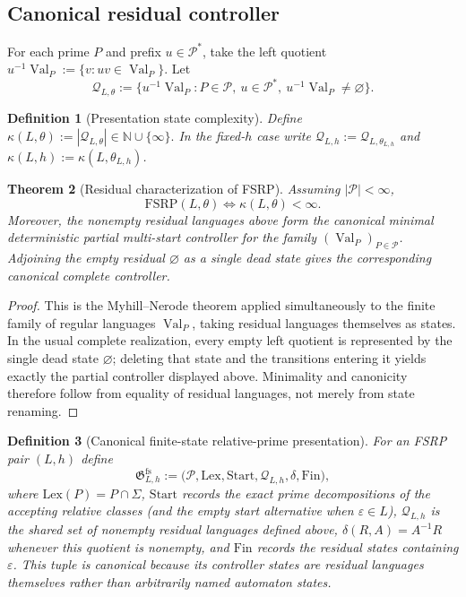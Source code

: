 \documentclass[11pt,a4paper]{article}
\newtheorem{theorem}{Theorem}[section]
\newtheorem{definition}[theorem]{Definition}
\newcommand{\eps}{\varepsilon}
\newcommand{\Pcal}{\mathcal P}
\newcommand{\Qcal}{\mathcal Q}
\newcommand{\Val}{\operatorname{Val}}
\newcommand{\Nat}{\mathbb N}
\begin{document}
\subsection{Canonical residual controller}

For each prime $P$ and prefix $u\in\Pcal^*$, take the left quotient
\(u^{-1}\Val_P:=\{v:uv\in\Val_P\}.\)
Let
\[
  \Qcal_{L,\theta}
  :=
  \{u^{-1}\Val_P:
  P\in\Pcal,\ u\in\Pcal^*,\ u^{-1}\Val_P\neq\varnothing\}.
\]

\begin{definition}[Presentation state complexity]
Define
\(\kappa(L,\theta):=|\Qcal_{L,\theta}|\in\Nat\cup\{\infty\}.\)
In the fixed-$h$ case write $\Qcal_{L,h}:=\Qcal_{L,\theta_{L,h}}$ and $\kappa(L,h):=\kappa(L,\theta_{L,h})$.
\end{definition}

\begin{theorem}[Residual characterization of FSRP]
Assuming $|\Pcal|<\infty$,
\[
  \mathrm{FSRP}(L,\theta)\iff\kappa(L,\theta)<\infty.
\]
Moreover, the nonempty residual languages above form the canonical minimal deterministic partial multi-start controller for the family $(\Val_P)_{P\in\Pcal}$.  Adjoining the empty residual $\varnothing$ as a single dead state gives the corresponding canonical complete controller.
\end{theorem}

\begin{proof}
This is the Myhill--Nerode theorem applied simultaneously to the finite family of regular languages $\Val_P$, taking residual languages themselves as states.  In the usual complete realization, every empty left quotient is represented by the single dead state $\varnothing$; deleting that state and the transitions entering it yields exactly the partial controller displayed above.  Minimality and canonicity therefore follow from equality of residual languages, not merely from state renaming.
\end{proof}

\begin{definition}[Canonical finite-state relative-prime presentation]
\label{def:canonical-fsrp}
For an FSRP pair $(L,h)$ define
\[
  \mathfrak G^{\mathrm{fs}}_{L,h}
  :=
  \bigl(
    \Pcal,\mathrm{Lex},\mathrm{Start},
    \Qcal_{L,h},\delta,\mathrm{Fin}
  \bigr),
\]
where $\mathrm{Lex}(P)=P\cap\Sigma$, $\mathrm{Start}$ records the exact prime decompositions of the accepting relative classes (and the empty start alternative when $\eps\in L$), $\Qcal_{L,h}$ is the shared set of nonempty residual languages defined above, $\delta(R,A)=A^{-1}R$ whenever this quotient is nonempty, and $\mathrm{Fin}$ records the residual states containing $\eps$.  This tuple is canonical because its controller states are residual languages themselves rather than arbitrarily named automaton states.
\end{definition}
\end{document}
